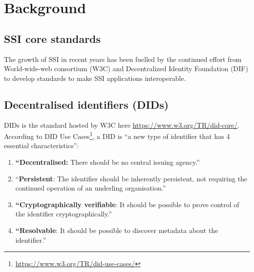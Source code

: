 \hypertarget{background}{%
\chapter{Background}\label{background}}


\hypertarget{ssi-core-standards}{%
\section{SSI core standards}\label{ssi-core-standards}}

The growth of SSI in recent years has been fuelled by the continued effort from World-wide-web consortium (W3C) and Decentralized Identity Foundation (DIF) to develop standards to make SSI applications interoperable.

\hypertarget{decentralised-identifiers-dids}{%
\section{Decentralised identifiers
(DIDs)}\label{decentralised-identifiers-dids}}

DIDs is the standard hosted by W3C here \url{https://www.w3.org/TR/did-core/}. According to DID Use Cases\footnote{\url{https://www.w3.org/TR/did-use-cases/}}, a DID is ``a new type of identifier that has 4 essential characteristics'':

\begin{enumerate}
\def\labelenumi{\arabic{enumi}.}
\tightlist
\item
  \textbf{``Decentralised:} There should be no central issuing agency.''
\item
  ``\textbf{Persistent}: The identifier should be inherently persistent,
  not requiring the continued operation of an underling organisation.''
\item
  \textbf{``Cryptographically verifiable}: It should be possible to prove
  control of the identifier cryptographically.''
\item
  \textbf{``Resolvable}: It should be possible to discover metadata about
  the identifier.''
\end{enumerate}



\pagebreak





